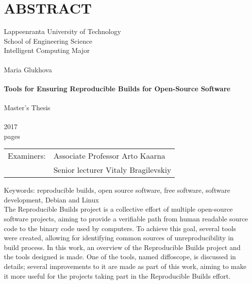 \section*{ABSTRACT}

Lappeenranta University of Technology\\
School of Engineering Science\\
Intelligent Computing Major\\
\\

Maria Glukhova\\
\\
\textbf{Tools for Ensuring Reproducible Builds for Open-Source Software}\\
\\
Master's Thesis\\
\\
2017\\
\pageref{LastPage} pages\\


\begin{tabular}{l p{11.0cm}}  
  
Examiners: & Associate Professor \foreignlanguage{finnish}{Arto Kaarna}\\
& Senior lecturer Vitaly Bragilevskiy\\

\end {tabular}

Keywords: reproducible builds, open source software, free software, software development, Debian and Linux\\


The Reproducible Builds project is a collective effort of multiple open-source software
projects, aiming to provide a verifiable path from human readable source code
to the binary code used by computers. To achieve this goal, several tools were
created, allowing for identifying common sources of unreproducibility in build
process.
In this work, an overview of the Reproducible Builds project and the tools designed is made. One of the tools, named diffoscope, is discussed in details; several improvements to it are made as part of this work, aiming to make it more useful for the projects taking part in the Reproducible Builds effort.\\
